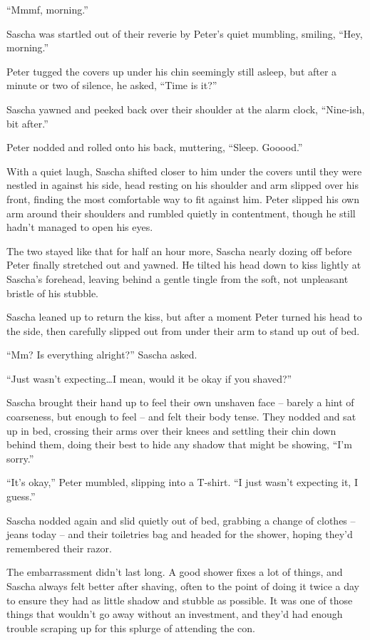 ``Mmmf, morning.''

Sascha was startled out of their reverie by Peter's quiet mumbling, smiling, ``Hey, morning.''

Peter tugged the covers up under his chin seemingly still asleep, but after a minute or two of silence, he asked, ``Time is it?''

Sascha yawned and peeked back over their shoulder at the alarm clock, ``Nine-ish, bit after.''

Peter nodded and rolled onto his back, muttering, ``Sleep. Gooood.''

With a quiet laugh, Sascha shifted closer to him under the covers until they were nestled in against his side, head resting on his shoulder and arm slipped over his front, finding the most comfortable way to fit against him. Peter slipped his own arm around their shoulders and rumbled quietly in contentment, though he still hadn't managed to open his eyes.

The two stayed like that for half an hour more, Sascha nearly dozing off before Peter finally stretched out and yawned. He tilted his head down to kiss lightly at Sascha's forehead, leaving behind a gentle tingle from the soft, not unpleasant bristle of his stubble.

Sascha leaned up to return the kiss, but after a moment Peter turned his head to the side, then carefully slipped out from under their arm to stand up out of bed.

``Mm? Is everything alright?'' Sascha asked.

``Just wasn't expecting\ldots{}I mean, would it be okay if you shaved?''

Sascha brought their hand up to feel their own unshaven face -- barely a hint of coarseness, but enough to feel -- and felt their body tense. They nodded and sat up in bed, crossing their arms over their knees and settling their chin down behind them, doing their best to hide any shadow that might be showing, ``I'm sorry.''

``It's okay,'' Peter mumbled, slipping into a T-shirt. ``I just wasn't expecting it, I guess.''

Sascha nodded again and slid quietly out of bed, grabbing a change of clothes -- jeans today -- and their toiletries bag and headed for the shower, hoping they'd remembered their razor.

\secdiv

The embarrassment didn't last long. A good shower fixes a lot of things, and Sascha always felt better after shaving, often to the point of doing it twice a day to ensure they had as little shadow and stubble as possible. It was one of those things that wouldn't go away without an investment, and they'd had enough trouble scraping up for this splurge of attending the con.

